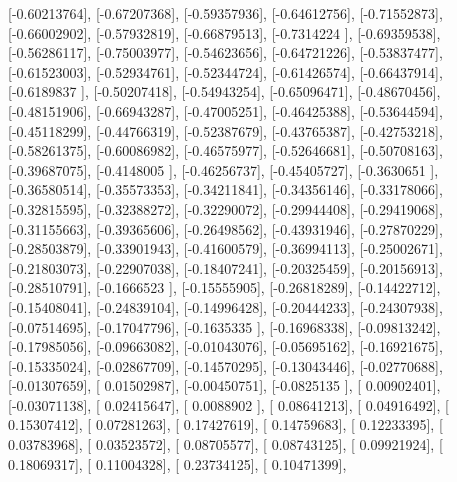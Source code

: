 \documentclass{article}
\begin{document}
       [-0.60213764],
       [-0.67207368],
       [-0.59357936],
       [-0.64612756],
       [-0.71552873],
       [-0.66002902],
       [-0.57932819],
       [-0.66879513],
       [-0.7314224 ],
       [-0.69359538],
       [-0.56286117],
       [-0.75003977],
       [-0.54623656],
       [-0.64721226],
       [-0.53837477],
       [-0.61523003],
       [-0.52934761],
       [-0.52344724],
       [-0.61426574],
       [-0.66437914],
       [-0.6189837 ],
       [-0.50207418],
       [-0.54943254],
       [-0.65096471],
       [-0.48670456],
       [-0.48151906],
       [-0.66943287],
       [-0.47005251],
       [-0.46425388],
       [-0.53644594],
       [-0.45118299],
       [-0.44766319],
       [-0.52387679],
       [-0.43765387],
       [-0.42753218],
       [-0.58261375],
       [-0.60086982],
       [-0.46575977],
       [-0.52646681],
       [-0.50708163],
       [-0.39687075],
       [-0.4148005 ],
       [-0.46256737],
       [-0.45405727],
       [-0.3630651 ],
       [-0.36580514],
       [-0.35573353],
       [-0.34211841],
       [-0.34356146],
       [-0.33178066],
       [-0.32815595],
       [-0.32388272],
       [-0.32290072],
       [-0.29944408],
       [-0.29419068],
       [-0.31155663],
       [-0.39365606],
       [-0.26498562],
       [-0.43931946],
       [-0.27870229],
       [-0.28503879],
       [-0.33901943],
       [-0.41600579],
       [-0.36994113],
       [-0.25002671],
       [-0.21803073],
       [-0.22907038],
       [-0.18407241],
       [-0.20325459],
       [-0.20156913],
       [-0.28510791],
       [-0.1666523 ],
       [-0.15555905],
       [-0.26818289],
       [-0.14422712],
       [-0.15408041],
       [-0.24839104],
       [-0.14996428],
       [-0.20444233],
       [-0.24307938],
       [-0.07514695],
       [-0.17047796],
       [-0.1635335 ],
       [-0.16968338],
       [-0.09813242],
       [-0.17985056],
       [-0.09663082],
       [-0.01043076],
       [-0.05695162],
       [-0.16921675],
       [-0.15335024],
       [-0.02867709],
       [-0.14570295],
       [-0.13043446],
       [-0.02770688],
       [-0.01307659],
       [ 0.01502987],
       [-0.00450751],
       [-0.0825135 ],
       [ 0.00902401],
       [-0.03071138],
       [ 0.02415647],
       [ 0.0088902 ],
       [ 0.08641213],
       [ 0.04916492],
       [ 0.15307412],
       [ 0.07281263],
       [ 0.17427619],
       [ 0.14759683],
       [ 0.12233395],
       [ 0.03783968],
       [ 0.03523572],
       [ 0.08705577],
       [ 0.08743125],
       [ 0.09921924],
       [ 0.18069317],
       [ 0.11004328],
       [ 0.23734125],
       [ 0.10471399],
\end{document}
